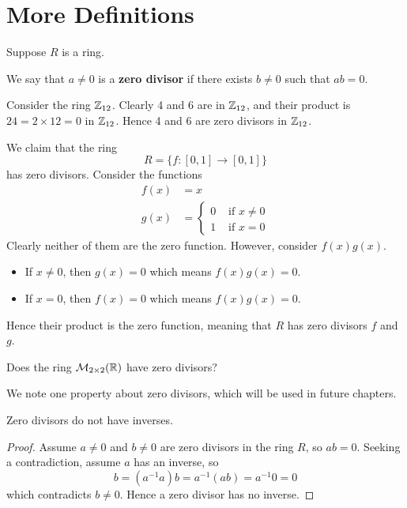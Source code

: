 \section{More Definitions}
Suppose $R$ is a ring.
\begin{definition}
    We say that $a \neq 0$ is a \textbf{zero divisor} if there exists $b \neq 0$ such that $ab = 0$.
\end{definition}
\begin{example}
    Consider the ring $\mathbb{Z}_{12}$. Clearly 4 and 6 are in $\mathbb{Z}_{12}$, and their product is $24 = 2 \times 12 = 0$ in $\mathbb{Z}_{12}$. Hence 4 and 6 are zero divisors in $\mathbb{Z}_{12}$.
\end{example}
\begin{example}
    We claim that the ring
    \[
        R = \{f: [0, 1] \to [0, 1]\}
    \]
    has zero divisors. Consider the functions
    \begin{align*}
        f(x) &= x\\
        g(x) &= \begin{cases}
            0 & \text{ if } x \neq 0\\
            1 & \text{ if } x = 0
        \end{cases}
    \end{align*}
    Clearly neither of them are the zero function. However, consider $f(x)g(x)$.
    \begin{itemize}
        \item If $x \neq 0$, then $g(x) = 0$ which means $f(x)g(x) = 0$.
        \item If $x = 0$, then $f(x) = 0$ which means $f(x)g(x) = 0$.
    \end{itemize}
    Hence their product is the zero function, meaning that $R$ has zero divisors $f$ and $g$.
\end{example}
\begin{exercise}
    Does the ring $\mathcal{M}_{2\times2}(\mathbb{R})$ have zero divisors?
\end{exercise}
We note one property about zero divisors, which will be used in future chapters.
\begin{proposition}\label{prop-zero-divisors-have-no-inverses}
    Zero divisors do not have inverses.
\end{proposition}
\begin{proof}
    Assume $a \neq 0$ and $b \neq 0$ are zero divisors in the ring $R$, so $ab = 0$. Seeking a contradiction, assume $a$ has an inverse, so
    \[
        b = (a^{-1}a)b = a^{-1}(ab) = a^{-1}0 = 0    
    \]
    which contradicts $b \neq 0$. Hence a zero divisor has no inverse.
\end{proof}

